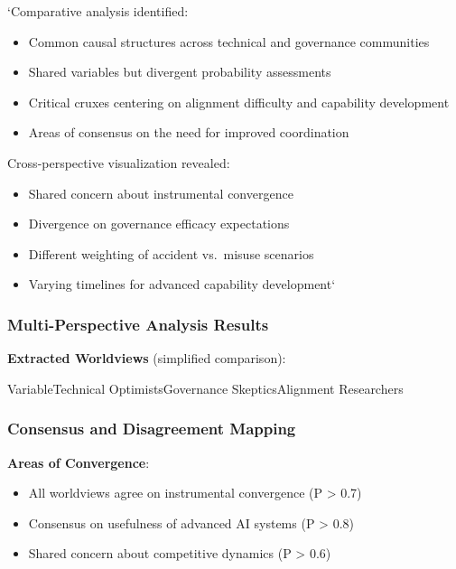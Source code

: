 \documentclass[
  11pt,
  letterpaper,
]{book}
\providecommand{\tightlist}{%
  \setlength{\itemsep}{0pt}\setlength{\parskip}{0pt}}
\begin{document}
`Comparative analysis identified:

\begin{itemize}
\tightlist
\item
  Common causal structures across technical and governance communities
\item
  Shared variables but divergent probability assessments
\item
  Critical cruxes centering on alignment difficulty and capability
  development
\item
  Areas of consensus on the need for improved coordination
\end{itemize}

Cross-perspective visualization revealed:

\begin{itemize}
\tightlist
\item
  Shared concern about instrumental convergence
\item
  Divergence on governance efficacy expectations
\item
  Different weighting of accident vs.~misuse scenarios
\item
  Varying timelines for advanced capability development`
\end{itemize}

\subsubsection{Multi-Perspective Analysis
Results}\label{sec-multi-perspective}

\textbf{Extracted Worldviews} (simplified comparison):

\textbar Variable\textbar Technical Optimists\textbar Governance
Skeptics\textbar Alignment Researchers\textbar{}

\subsubsection{Consensus and Disagreement
Mapping}\label{sec-consensus-disagreement}

\textbf{Areas of Convergence}:

\begin{itemize}
\tightlist
\item
  All worldviews agree on instrumental convergence (P \textgreater{}
  0.7)
\item
  Consensus on usefulness of advanced AI systems (P \textgreater{} 0.8)
\item
  Shared concern about competitive dynamics (P \textgreater{} 0.6)
\end{itemize}
\end{document}
